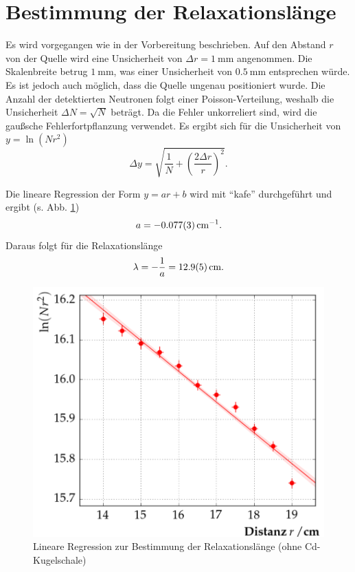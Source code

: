 \section{Bestimmung der Relaxationslänge}

Es wird vorgegangen wie in der Vorbereitung beschrieben. Auf den Abstand $r$ von der Quelle wird eine Unsicherheit von $\Delta r=\SI{1}{\milli\metre}$ angenommen. Die Skalenbreite betrug $\SI{1}{\milli\metre}$, was einer Unsicherheit von $\SI{0,5}{\milli\metre}$ entsprechen würde. Es ist jedoch auch möglich, dass die Quelle ungenau positioniert wurde.
Die Anzahl der detektierten Neutronen folgt einer Poisson-Verteilung, weshalb die Unsicherheit $\Delta N=\sqrt{N}$ beträgt. Da die Fehler unkorreliert sind, wird die gaußsche Fehlerfortpflanzung verwendet. Es ergibt sich für die Unsicherheit von $y=\ln(Nr^{2})$
\begin{equation}
 \Delta y = \sqrt{\frac{1}{N}+\left(\frac{2\Delta r}{r}\right)^{2}}.
\end{equation}

Die lineare Regression der Form $y=ar+b$ wird mit ``kafe'' durchgeführt und ergibt (s. Abb. \ref{fig:plot1})
\begin{equation}
 a = \SI{-0,077\pm0,003}{\per\centi\metre}.
\end{equation}
Daraus folgt für die Relaxationslänge
\begin{equation}
 \lambda = -\frac{1}{a} = \SI{12,9\pm0,5}{\centi\metre}.
\end{equation}

\begin{figure}[tb]
  \centering
  \includegraphics[scale=0.5]{./fig/plot1.png}
  \caption{Lineare Regression zur Bestimmung der Relaxationslänge (ohne Cd-Kugelschale)}
  \label{fig:plot1}
\end{figure}

